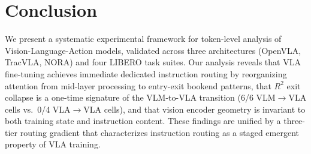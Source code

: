 \documentclass[10pt,twocolumn]{article}
\begin{document}
\section{Conclusion}
\label{sec:conclusion}

We present a systematic experimental framework for token-level analysis of Vision-Language-Action models, validated across three architectures (OpenVLA, TracVLA, NORA) and four LIBERO task suites.
Our analysis reveals that VLA fine-tuning achieves immediate dedicated instruction routing by reorganizing attention from mid-layer processing to entry-exit bookend patterns, that $R^2$ exit collapse is a one-time signature of the VLM-to-VLA transition (6/6 VLM$\to$VLA cells vs.\ 0/4 VLA$\to$VLA cells), and that vision encoder geometry is invariant to both training state and instruction content.
These findings are unified by a three-tier routing gradient that characterizes instruction routing as a staged emergent property of VLA training.
\end{document}

